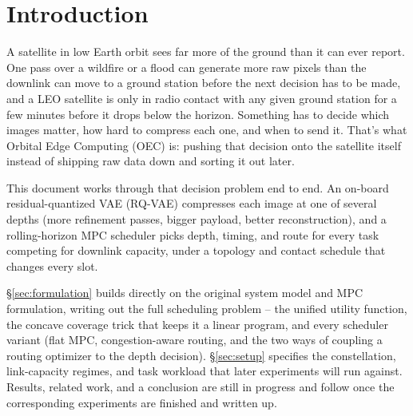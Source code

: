 \section{Introduction}
\label{sec:intro}

A satellite in low Earth orbit sees far more of the ground than it can ever report. One pass over a wildfire or a flood can generate more raw pixels than the downlink can move to a ground station before the next decision has to be made, and a LEO satellite is only in radio contact with any given ground station for a few minutes before it drops below the horizon. Something has to decide which images matter, how hard to compress each one, and when to send it. That's what Orbital Edge Computing (OEC) is: pushing that decision onto the satellite itself instead of shipping raw data down and sorting it out later.

This document works through that decision problem end to end. An on-board residual-quantized VAE (RQ-VAE) compresses each image at one of several depths (more refinement passes, bigger payload, better reconstruction), and a rolling-horizon MPC scheduler picks depth, timing, and route for every task competing for downlink capacity, under a topology and contact schedule that changes every slot.

\S\ref{sec:formulation} builds directly on the original system model and MPC formulation, writing out the full scheduling problem -- the unified utility function, the concave coverage trick that keeps it a linear program, and every scheduler variant (flat MPC, congestion-aware routing, and the two ways of coupling a routing optimizer to the depth decision). \S\ref{sec:setup} specifies the constellation, link-capacity regimes, and task workload that later experiments will run against. Results, related work, and a conclusion are still in progress and follow once the corresponding experiments are finished and written up.

